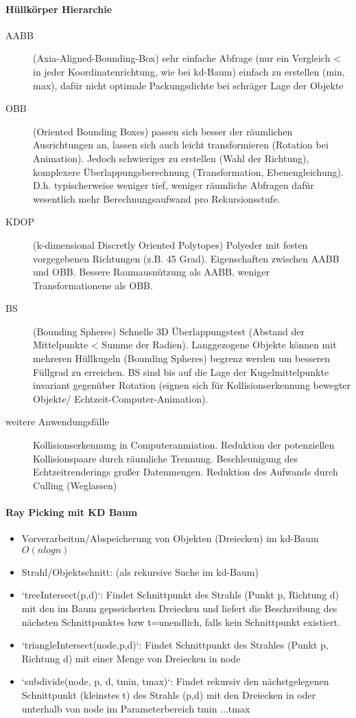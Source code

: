 \documentclass[10pt,landscape]{article}
\begin{document}
\begin{multicols}{3}
  \paragraph*{Hüllkörper Hierarchie}
  \begin{description}
    \item[AABB] (Axia-Aligned-Bounding-Box) sehr einfache Abfrage (nur ein Vergleich < in jeder Koordinatenrichtung, wie bei kd-Baum) einfach zu erstellen (min, max), dafür nicht optimale Packungsdichte bei schräger Lage der Objekte
    \item[OBB] (Oriented Bounding Boxes) passen sich besser der räumlichen Ausrichtungen an, lassen sich auch leicht transformieren (Rotation bei Animation). Jedoch schwieriger zu erstellen (Wahl der Richtung), komplexere Überlappungsberechnung (Transformation, Ebenengleichung). D.h. typischerweise weniger tief, weniger räumliche Abfragen dafür wesentlich mehr Berechnungsaufwand pro Rekursionsstufe.
    \item[KDOP] (k-dimensional Discretly Oriented Polytopes) Polyeder mit festen vorgegebenen Richtungen (z.B. 45 Grad). Eigenschaften zwischen AABB und OBB. Bessere Raumausnützung als AABB, weniger Transformationene als OBB.
    \item[BS] (Bounding Spheres) Schnelle 3D Überlappungstest (Abstand der Mittelpunkte < Summe der Radien). Langgezogene Objekte können mit mehreren Hüllkugeln (Bounding Spheres) begrenz werden um besseren Füllgrad zu erreichen. BS sind bis auf die Lage der Kugelmittelpunkte invariant gegenüber Rotation (eignen sich für Kollisionserkennung bewegter Objekte/ Echtzeit-Computer-Animation).
    \item[weitere Anwendungsfälle] Kollisionserkennung in Computeranmiation. Reduktion der potenziellen Kollisionspaare durch räumliche Trennung. Beschleunigung des Echtzeitrenderings großer Datenmengen. Reduktion des Aufwands durch Culling (Weglassen)
  \end{description}
  
  \paragraph{Ray Picking mit KD Baum}
  \begin{itemize}
    \item Vorverarbeitun/Abspeicherung von Objekten (Dreiecken) im kd-Baum$O(n log n)$
    \item Strahl/Objektschnitt: (als rekursive Suche im kd-Baum)
    \item `treeIntersect(p,d)`: Findet Schnittpunkt des Strahls (Punkt p, Richtung d) mit den im Baum gepseicherten Dreiecken und liefert die Beschreibung des nächsten Schnittpunktes bzw t=unendlich, falls kein Schnittpunkt existiert.
    \item `triangleIntersect(node,p,d)`: Findet Schnittpunkt des Strahles (Punkt p, Richtung d) mit einer Menge von Dreiecken in node
    \item `subdivide(node, p, d, tmin, tmax)`: Findet rekursiv den nächstgelegenen Schnittpunkt (kleinstes t) des Strahls (p,d) mit den Dreiecken in oder unterhalb von node im Parameterbereich tmin ...tmax
  \end{itemize}
  

\end{multicols}
\end{document}

